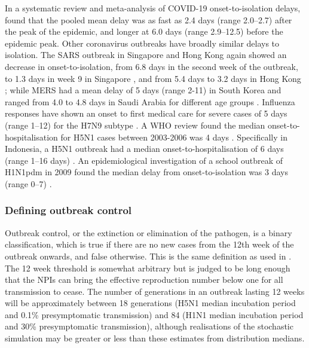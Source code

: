 \documentclass{article}
\begin{document}
In a systematic review and meta-analysis of COVID-19 onset-to-isolation delays, \cite{aliSerialIntervalsCase2022} found that the pooled mean delay was as fast as 2.4 days (range 2.0–2.7) after the peak of the epidemic, and longer at 6.0 days (range 2.9–12.5) before the epidemic peak. Other coronavirus outbreaks have broadly similar delays to isolation. The SARS outbreak in Singapore and Hong Kong again showed an decrease in onset-to-isolation, from 6.8 days in the second week of the outbreak, to 1.3 days in week 9 in Singapore \citep{tanSARSSingaporekeyLessons2006}, and from 5.4 days to 3.2 days in Hong Kong \citep{donnellyEpidemiologicalDeterminantsSpread2003a}; while MERS had a mean delay of 5 days (range 2-11) in South Korea \citep{kimClinicalProgressionCytokine2016} and ranged from 4.0 to 4.8 days in Saudi Arabia for different age groups \citep{althobaityTimeSymptomOnset2024}. Influenza responses have shown an onset to first medical care for severe cases of 5 days (range 1–12) for the H7N9 subtype \citep{chenAsymptomaticMildSevere2014}. A WHO review found the median onset-to-hospitalisation for H5N1 cases between 2003-2006 was 4 days \citep{worldhealthorganizationUpdateWHOconfirmedHuman2007}. Specifically in Indonesia, a H5N1 outbreak had a median onset-to-hospitalisation of 6 days (range 1–16 days) \citep{kandunFactorsAssociatedCase2008}. An epidemiological investigation of a school outbreak of H1N1pdm in 2009 found the median delay from onset-to-isolation was 3 days (range 0–7) \citep{leungSchoolOutbreakPandemic2011}.

\subsubsection*{Defining outbreak control}

Outbreak control, or the extinction or elimination of the pathogen, is a binary classification, which is true if there are no new cases from the 12th week of the outbreak onwards, and false otherwise. This is the same definition as used in \cite{hellewellFeasibilityControllingCOVID192020}. The 12 week threshold is somewhat arbitrary but is judged to be long enough that the NPIs can bring the effective reproduction number below one for all transmission to cease. The number of generations in an outbreak lasting 12 weeks will be approximately between 18 generations (H5N1 median incubation period and 0.1\% presymptomatic transmission) and 84 (H1N1 median incubation period and 30\% presymptomatic transmission), although realisations of the stochastic simulation may be greater or less than these estimates from distribution medians. \\
\end{document}
